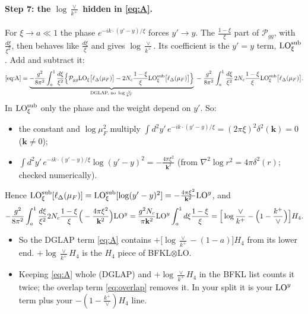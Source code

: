 \documentclass[10pt]{article}
\numberwithin{equation}{section}
\newcommand{\LO}{{\rm LO}}
\begin{document}
\paragraph{Step 7: the $\log\frac{\vee}{k^+}$ hidden in \eqref{eq:A}.} For $\xi\to a\ll1$ the phase $e^{-ik\cdot(y'-y)/\xi}$ forces $y'\to y$. The $\frac{1-\xi}{\xi}$ part of $\mathcal P_{gg}$, with $\frac{d\xi}{\xi^2}$, then behaves like $\frac{d\xi}{\xi}$ and gives $\log\frac{\vee}{k^+}$. Its coefficient is the $y'=y$ term, $\LO^{\rm sub}_\xi$. Add and subtract it:
\begin{equation}
\eqref{eq:A}=\underbrace{-\frac{g^2}{8\pi^2}\int_a^1\frac{d\xi}{\xi^2}\Big\{\mathcal P_{gg}\LO_\xi\big[\ell_\Delta(\mu_F)\big]-2N_c\frac{1-\xi}{\xi}\LO^{\rm sub}_\xi\big[\ell_\Delta(\mu_F)\big]\Big\}}_{\text{DGLAP, no }\log\frac{\vee}{k^+}}\;-\;\frac{g^2}{8\pi^2}\int_a^1\frac{d\xi}{\xi^2}\,2N_c\frac{1-\xi}{\xi}\LO^{\rm sub}_\xi\big[\ell_\Delta(\mu_F)\big].
\end{equation}
In $\LO^{\rm sub}_\xi$ only the phase and the weight depend on $y'$. So:
\begin{itemize}
\item the constant and $\log\mu_F^2$ multiply $\int d^2y'\,e^{-ik\cdot(y'-y)/\xi}=(2\pi\xi)^2\delta^2(\mathbf k)=0$ ($\mathbf k\neq0$);
\item $\int d^2y'\,e^{-ik\cdot(y'-y)/\xi}\log(y'-y)^2=-\frac{4\pi\xi^2}{\mathbf k^2}$ (from $\nabla^2\log r^2=4\pi\delta^2(r)$; checked numerically).
\end{itemize}
Hence $\LO^{\rm sub}_\xi[\ell_\Delta(\mu_F)]=\LO^{\rm sub}_\xi[\log(y'-y)^2]=-\frac{4\pi\xi^2}{\mathbf k^2}\LO^y$, and
\begin{equation}
-\frac{g^2}{8\pi^2}\int_a^1\frac{d\xi}{\xi^2}2N_c\frac{1-\xi}{\xi}\Big(-\frac{4\pi\xi^2}{\mathbf k^2}\Big)\LO^y=\frac{g^2N_c}{\pi\mathbf k^2}\LO^y\int_a^1d\xi\frac{1-\xi}{\xi}=\Big[\log\frac{\vee}{k^+}-\Big(1-\frac{k^+}{\vee}\Big)\Big]H_4.\label{eq:subval}
\end{equation}
\begin{itemize}
\item So the DGLAP term \eqref{eq:A} contains $+\big[\log\frac{\vee}{k^+}-(1-a)\big]H_4$ from its lower end. $+\log\frac{\vee}{k^+}H_4$ is the $H_4$ piece of BFKL$\otimes$LO.
\item Keeping \eqref{eq:A} whole (DGLAP) and $+\log\frac{\vee}{k^+}H_4$ in the BFKL list counts it twice; the overlap term \eqref{eq:overlap} removes it. In your split it is your $\LO^y$ term plus your $-(1-\frac{k^+}{\vee})H_4$ line.
\end{itemize}
\end{document}

